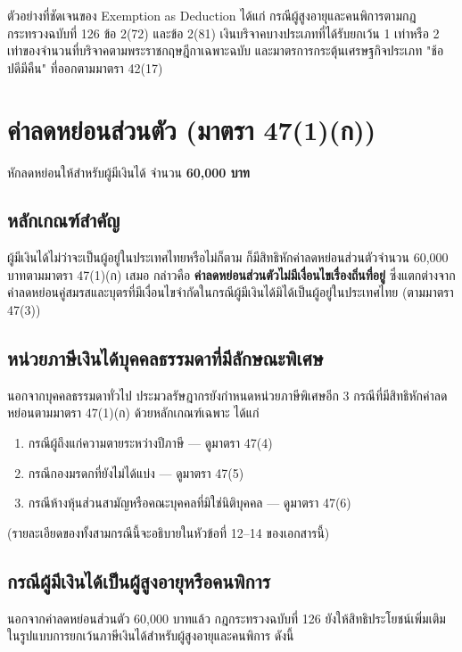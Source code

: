 \documentclass[12pt,a4paper]{article}
\newcommand{\hilight}[1]{\textbf{#1}}
\begin{document}
ตัวอย่างที่ชัดเจนของ Exemption as Deduction ได้แก่ กรณีผู้สูงอายุและคนพิการตามกฎกระทรวงฉบับที่ 126 ข้อ 2(72) และข้อ 2(81) เงินบริจาคบางประเภทที่ได้รับยกเว้น 1 เท่าหรือ 2 เท่าของจำนวนที่บริจาคตามพระราชกฤษฎีกาเฉพาะฉบับ และมาตรการกระตุ้นเศรษฐกิจประเภท "ช้อปดีมีคืน" ที่ออกตามมาตรา 42(17)

\newpage
\section{ค่าลดหย่อนส่วนตัว (มาตรา 47(1)(ก))}

หักลดหย่อนให้สำหรับผู้มีเงินได้ จำนวน \hilight{60,000 บาท}

\subsection*{หลักเกณฑ์สำคัญ}

ผู้มีเงินได้ไม่ว่าจะเป็นผู้อยู่ในประเทศไทยหรือไม่ก็ตาม ก็มีสิทธิหักค่าลดหย่อนส่วนตัวจำนวน 60,000 บาทตามมาตรา 47(1)(ก) เสมอ กล่าวคือ \hilight{ค่าลดหย่อนส่วนตัวไม่มีเงื่อนไขเรื่องถิ่นที่อยู่} ซึ่งแตกต่างจากค่าลดหย่อนคู่สมรสและบุตรที่มีเงื่อนไขจำกัดในกรณีผู้มีเงินได้มิได้เป็นผู้อยู่ในประเทศไทย (ตามมาตรา 47(3))

\subsection*{หน่วยภาษีเงินได้บุคคลธรรมดาที่มีลักษณะพิเศษ}

นอกจากบุคคลธรรมดาทั่วไป ประมวลรัษฎากรยังกำหนดหน่วยภาษีพิเศษอีก 3 กรณีที่มีสิทธิหักค่าลดหย่อนตามมาตรา 47(1)(ก) ด้วยหลักเกณฑ์เฉพาะ ได้แก่

\begin{enumerate}
    \item กรณีผู้ถึงแก่ความตายระหว่างปีภาษี --- ดูมาตรา 47(4)
    \item กรณีกองมรดกที่ยังไม่ได้แบ่ง --- ดูมาตรา 47(5)
    \item กรณีห้างหุ้นส่วนสามัญหรือคณะบุคคลที่มิใช่นิติบุคคล --- ดูมาตรา 47(6)
\end{enumerate}

(รายละเอียดของทั้งสามกรณีนี้จะอธิบายในหัวข้อที่ 12--14 ของเอกสารนี้)

\subsection*{กรณีผู้มีเงินได้เป็นผู้สูงอายุหรือคนพิการ}

นอกจากค่าลดหย่อนส่วนตัว 60,000 บาทแล้ว กฎกระทรวงฉบับที่ 126 ยังให้สิทธิประโยชน์เพิ่มเติมในรูปแบบการยกเว้นภาษีเงินได้สำหรับผู้สูงอายุและคนพิการ ดังนี้
\end{document}
